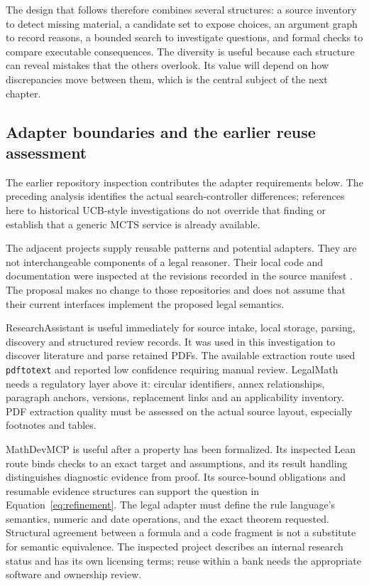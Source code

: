 \documentclass[12pt,a4paper,oneside,openany]{book}
\begin{document}
The design that follows therefore combines several structures: a source inventory
to detect missing material, a candidate set to expose choices, an argument graph
to record reasons, a bounded search to investigate questions, and formal checks
to compare executable consequences. The diversity is useful because each
structure can reveal mistakes that the others overlook. Its value will depend on
how discrepancies move between them, which is the central subject of the next
chapter.

\subsection{Adapter boundaries and the earlier reuse assessment}

The earlier repository inspection contributes the adapter requirements below.
The preceding analysis identifies the actual search-controller differences;
references here to historical UCB-style investigations do not override that
finding or establish that a generic MCTS service is already available.


\label{merge:P-04-prototype:03}


The adjacent projects supply reusable patterns and potential adapters. They are
not interchangeable components of a legal reasoner. Their local code and
documentation were inspected at the revisions recorded in the source manifest
\citep{localrepos}. The proposal makes no change to those repositories and does
not assume that their current interfaces implement the proposed legal semantics.

ResearchAssistant is useful immediately for source intake, local storage, parsing,
discovery and structured review records. It was used in this investigation to
discover literature and parse retained PDFs. The available extraction route used
\texttt{pdftotext} and reported low confidence requiring manual review. LegalMath
needs a regulatory layer above it: circular identifiers, annex relationships,
paragraph anchors, versions, replacement links and an applicability inventory.
PDF extraction quality must be assessed on the actual source layout, especially
footnotes and tables.

MathDevMCP is useful after a property has been formalized. Its inspected Lean
route binds checks to an exact target and assumptions, and its result handling
distinguishes diagnostic evidence from proof. Its source-bound obligations and
resumable evidence structures can support the question in
Equation~\eqref{eq:refinement}. The legal adapter must define the rule language's
semantics, numeric and date operations, and the exact theorem requested. Structural
agreement between a formula and a code fragment is not a substitute for semantic
equivalence. The inspected project describes an internal research status and
has its own licensing terms; reuse within a bank needs the appropriate software
and ownership review.
\end{document}
